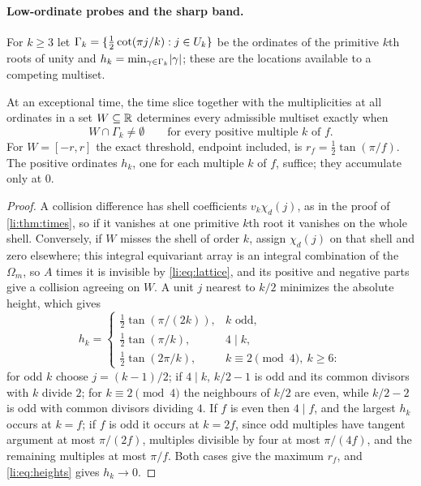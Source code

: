 \paragraph{Low-ordinate probes and the sharp band.}
For $k\ge3$ let $\Gamma_k=\{\frac12\cot(\pi j/k):j\in U_k\}$ be the ordinates of the primitive $k$th roots of unity
and $h_k=\min_{\gamma\in\Gamma_k}\lvert\gamma\rvert$; these are the locations available to a competing multiset.

\begin{theorem}\label{li:thm:probe}
At an exceptional time, the time slice together with the multiplicities at all ordinates in a set $W\subseteq\mathbb{R}$
determines every admissible multiset exactly when
\begin{equation}\label{li:eq:hit}
 W\cap\Gamma_k\ne\emptyset\qquad\text{for every positive multiple $k$ of $f$}.
\end{equation}
For $W=[-r,r]$ the exact threshold, endpoint included, is $r_f=\frac12\tan(\pi/f)$. The positive ordinates $h_k$, one
for each multiple $k$ of $f$, suffice; they accumulate only at $0$.
\end{theorem}

\begin{proof}
A collision difference has shell coefficients $v_k\chi_d(j)$, as in the proof of \cref{li:thm:times}, so if it vanishes at
one primitive $k$th root it vanishes on the whole shell. Conversely, if $W$ misses the shell of order $k$, assign
$\chi_d(j)$ on that shell and zero elsewhere; this integral equivariant array is an integral combination of the
$\Omega_m$, so $A$ times it is invisible by \eqref{li:eq:lattice}, and its positive and negative parts give a collision
agreeing on $W$. A unit $j$ nearest to $k/2$ minimizes the absolute height, which gives
\begin{equation}\label{li:eq:heights}
 h_k=\begin{cases}\frac12\tan(\pi/(2k)),&k\text{ odd},\\ \frac12\tan(\pi/k),&4\mid k,\\ \frac12\tan(2\pi/k),&k\equiv2\pmod4,\ k\ge6:\end{cases}
\end{equation}
for odd $k$ choose $j=(k-1)/2$; if $4\mid k$, $k/2-1$ is odd and its common divisors with $k$ divide $2$; for
$k\equiv2\pmod4$ the neighbours of $k/2$ are even, while $k/2-2$ is odd with common divisors dividing $4$. If $f$ is
even then $4\mid f$, and the largest $h_k$ occurs at $k=f$; if $f$ is odd it occurs at $k=2f$, since odd multiples
have tangent argument at most $\pi/(2f)$, multiples divisible by four at most $\pi/(4f)$, and the remaining multiples
at most $\pi/f$. Both cases give the maximum $r_f$, and \eqref{li:eq:heights} gives $h_k\to0$.
\end{proof}

